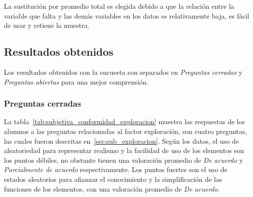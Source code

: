 La sustitución por promedio total es elegida debido a que la relación entre la
variable que falta y las demás variables en los datos es relativamente baja, es
fácil de usar y retiene la muestra. 



\subsection{Resultados obtenidos}
\label{sec:res_subjetiva}

Los resultados obtenidos con la encuesta son separados en \emph{Preguntas cerradas} y 
\emph{Preguntas abiertas} para una mejor comprensión.

\subsubsection{Preguntas cerradas}

La tabla~\ref{tab:subjetiva_conformidad_exploracion} muestra las respuestas de
los alumnos a las preguntas relacionadas al factor exploración, son cuatro
preguntas, las cuales fueron descritas en~\ref{sec:sub_exploracion}. Según los
datos, el uso de aleatoriedad para representar realismo y la facilidad de uso de los elementos 
son los puntos débiles, no obstante tienen una valoración promedio de \emph{De acuerdo} y 
\emph{Parcialmente de acuerdo} respectivamente. Los puntos fuertes son el uso de estados aleatorios 
para afianzar el conocimiento y la simplificación de las funciones de los elementos, con una 
valoración promedio de \emph{De acuerdo}.


